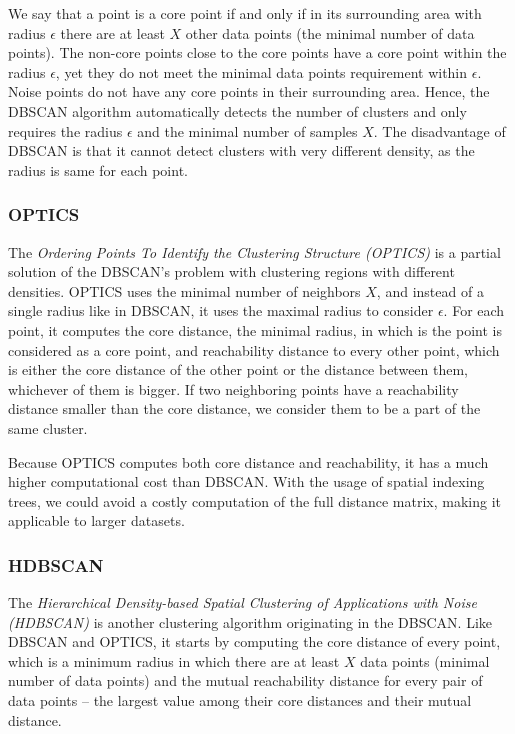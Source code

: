 We say that a point is a core point if and only if in its surrounding area with radius $\epsilon$ there are at least $X$ other data points (the minimal number of data points). The non-core points close to the core points have a core point within the radius $\epsilon$, yet they do not meet the minimal data points requirement within $\epsilon$. Noise points do not have any core points in their surrounding area. Hence, the DBSCAN algorithm automatically detects the number of clusters and only requires the radius $\epsilon$ and the minimal number of samples $X$. The disadvantage of DBSCAN is that it cannot detect clusters with very different density, as the radius is same for each point.

\subsubsection{OPTICS}
The \textit{Ordering Points To Identify the Clustering Structure (OPTICS)} \cite{vis:optics} is a partial solution of the DBSCAN's problem with clustering regions with different densities. OPTICS uses the minimal number of neighbors $X$, and instead of a single radius like in DBSCAN, it uses the maximal radius to consider $\epsilon$. For each point, it computes the core distance, the minimal radius, in which is the point is considered as a core point, and reachability distance to every other point, which is either the core distance of the other point or the distance between them, whichever of them is bigger. If two neighboring points have a reachability distance smaller than the core distance, we consider them to be a part of the same cluster.

Because OPTICS computes both core distance and reachability, it has a much higher computational cost than DBSCAN. With the usage of spatial indexing trees, we could avoid a costly computation of the full distance matrix, making it applicable to larger datasets.

\subsubsection{HDBSCAN}
The \textit{Hierarchical Density-based Spatial Clustering of Applications with Noise (HDBSCAN)} \cite{vis:hdbscan} is another clustering algorithm originating in the DBSCAN. Like DBSCAN and OPTICS, it starts by computing the core distance of every point, which is a minimum radius in which there are at least $X$ data points (minimal number of data points) and the mutual reachability distance for every pair of data points -- the largest value among their core distances and their mutual distance.

